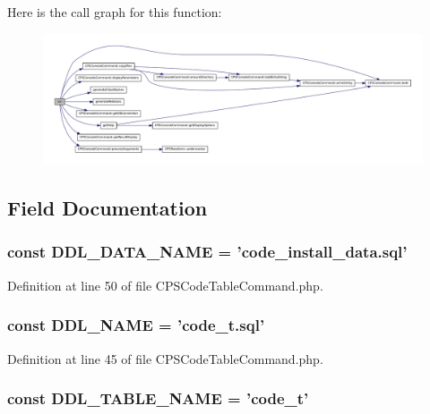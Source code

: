Here is the call graph for this function:\nopagebreak
\begin{figure}[H]
\begin{center}
\leavevmode
\includegraphics[width=400pt]{classCPSCodeTableCommand_a330e31e8c3572ce01a4e1c8485c6aedd_cgraph}
\end{center}
\end{figure}




\subsection{Field Documentation}
\hypertarget{classCPSCodeTableCommand_ac4ef63ea01237fca6e5977e7cf0ad6fa}{
\subsubsection[{DDL\_\-DATA\_\-NAME}]{\setlength{\rightskip}{0pt plus 5cm}const {\bf DDL\_\-DATA\_\-NAME} = 'code\_\-install\_\-data.sql'}}
\label{classCPSCodeTableCommand_ac4ef63ea01237fca6e5977e7cf0ad6fa}


Definition at line 50 of file CPSCodeTableCommand.php.

\hypertarget{classCPSCodeTableCommand_a1e548fb71c67f7f778a311f3019b9ff3}{
\subsubsection[{DDL\_\-NAME}]{\setlength{\rightskip}{0pt plus 5cm}const {\bf DDL\_\-NAME} = 'code\_\-t.sql'}}
\label{classCPSCodeTableCommand_a1e548fb71c67f7f778a311f3019b9ff3}


Definition at line 45 of file CPSCodeTableCommand.php.

\hypertarget{classCPSCodeTableCommand_aab7e20a5077f2a3b17ab9ae1ca8bd744}{
\subsubsection[{DDL\_\-TABLE\_\-NAME}]{\setlength{\rightskip}{0pt plus 5cm}const {\bf DDL\_\-TABLE\_\-NAME} = 'code\_\-t'}}
\label{classCPSCodeTableCommand_aab7e20a5077f2a3b17ab9ae1ca8bd744}


